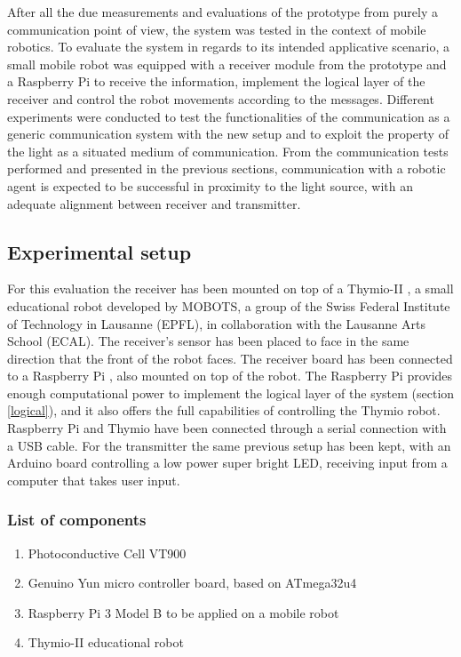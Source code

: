 After all the due measurements and evaluations of the prototype from purely a communication point of view, the system was tested in the context of mobile robotics.
To evaluate the system in regards to its intended applicative scenario, a small mobile robot was equipped with a receiver module from the prototype and a Raspberry Pi to receive the information, implement the logical layer of the receiver and control the robot movements according to the messages.
 Different experiments were conducted to test the functionalities of the communication as a generic communication system with the new setup and to exploit the property of the light as a situated medium of communication.
 From the communication tests performed and presented in the previous sections, communication with a robotic agent is expected to be successful in proximity to the light source, with an adequate alignment between receiver and transmitter.

\subsection{Experimental setup}
For this evaluation the receiver has been mounted on top of a Thymio-II \cite{thymio}, a small educational robot developed  by MOBOTS, a group of the Swiss Federal Institute of Technology in Lausanne (EPFL), in collaboration with the Lausanne Arts School (ECAL).
The receiver's sensor has been placed to face in the same direction that the front of the robot faces.
The receiver board has been connected to a Raspberry Pi \cite{raspberrypi}, also mounted on top of the robot.
The Raspberry Pi provides enough computational power to implement the logical layer of the system (section \ref{logical}), and it also offers the full capabilities of controlling the Thymio robot.
Raspberry Pi and Thymio have been connected through a serial connection with a USB cable.
For the transmitter the same previous setup has been kept, with an Arduino board controlling a low power super bright LED, receiving input from a computer that takes user input.

\subsubsection{List of components}
\begin{enumerate}
\item Photoconductive Cell VT900
\item Genuino Yun micro controller board, based on ATmega32u4 \cite{arduinoyun}
\item Raspberry Pi 3 Model B to be applied on a mobile robot
\item Thymio-II educational robot
\end{enumerate}

